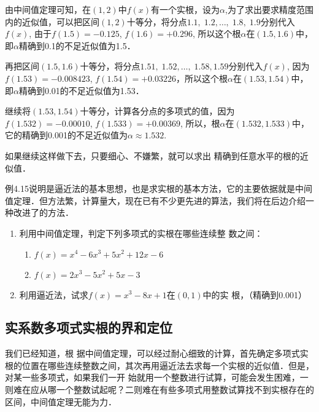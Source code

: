 \begin{solution}
    由中间值定理可知，在$(1, 2)$中$f(x)$有一个实根，设为$\alpha$,为了求出要求精度范围内的近似值，可以把区间$(1, 2)$十等分，将分点$1.1,\; 1.2,\ldots,\; 1.8,\; 1.9$分别代入$f(x)$, 由于$f(1. 5)=-0.125$, $f(1. 6)=+0.296$, 所以这个根$\alpha$在$(1.5, 1. 6)$中，即$\alpha$精确到0.1的不足近似值为1.5．
    
    再把区间$(1.5, 1. 6)$十等分，将分点$1.51,\; 1.52,\ldots,\; 1.58, 1.59$分别代入$f(x)$, 因为$f(1.53)=-0.008423$, $f(1.54)=+0.03226$，所以这个根$\alpha$在$(1.53, 1. 54)$中，即$\alpha$精确到0.01的不足近似值为1.53．

    继续将$(1.53, 1.54)$十等分，计算各分点的多项式的值，因为$f(1. 532)=-0. 00010$, $f(1. 533)=+0.00369$, 所以，根$\alpha$在$(1. 532, 1. 533)$中，它的精确到0.001的不足近似值为$\alpha\approx1.532$.

    如果继续这样做下去，只要细心、不嫌繁，就可以求出
    精确到任意水平的根的近似值．
\end{solution}

    例4.15说明是逼近法的基本思想，也是求实根的基本方法，它的主要依据就是中间值定理．但方法繁，计算量大，现在已有不少更先进的算法，我们将在后边介绍一种改进了的方法．

\begin{ex}
\begin{enumerate}
    \item 利用中间值定理，判定下列多项式的实根在哪些连续整
数之间：
\begin{enumerate}
    \item $f (x) =x^4-6x^3+5x^2+12x-6$
    \item $f (x) =2x^3-5x^2+5x-3$
\end{enumerate}
\item 利用逼近法，试求$f(x)=x^3-8x+1$在$(0, 1)$中的实
根，（精确到0.001）
\end{enumerate}
\end{ex}

\subsection{实系数多项式实根的界和定位}

我们已经知道，根
据中间值定理，可以经过耐心细致的计算，首先确定多项式实根的位置在哪些连续整数之间，其次再用逼近法去求每一个实根的近似值．但是，对某一些多项式，如果我们一开
始就用一个整数进行试算，可能会发生困难，一则难在应从哪一个整数试起呢？二则难在有些多项式用整数试算找不到实根存在的区间，中间值定理无能为力．

